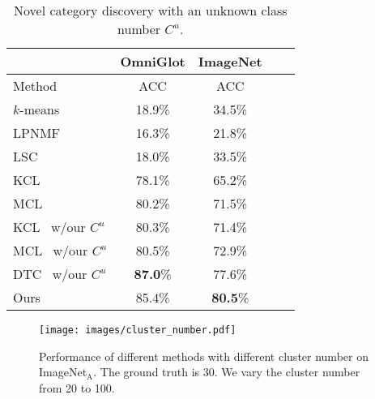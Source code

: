 \begin{table}[ht]
\footnotesize
\centering
\caption{Novel category discovery with an unknown class number $C^u$.}\label{tab:comparison_unknown}
\begin{tabular}{lcccc}
 \toprule
    & OmniGlot
    & ImageNet \\
\midrule
Method & ACC  & ACC  \\
\midrule
$k$-means~\cite{MackQueen67_Kmeans} & 18.9\% & 34.5\%\\
LPNMF~\cite{Cai09_LPNMF}  & 16.3\%  & 21.8\%\\
LSC~\cite{Chen11_LSC}  & 18.0\% & 33.5\% \\
\midrule
KCL~\cite{Hsu18_L2C} & 78.1\% & 65.2\% \\
MCL~\cite{Hsu19_MCL} & 80.2\% & 71.5\% \\
\midrule
KCL~\cite{Hsu18_L2C} w/our $C^u$               & 80.3\%          & 71.4\%  \\
MCL~\cite{Hsu19_MCL} w/our $C^u$               & 80.5\%          & 72.9\%  \\
DTC~\cite{han2019learning} w/our $C^u$        & \textbf{87.0}\%          & 77.6\% \\
\midrule
Ours           & 85.4\% & \textbf{80.5}\% \\
\bottomrule
\end{tabular}
\end{table}

\begin{figure}
  \centering
  \texttt{[image: images/cluster\_number.pdf]}
  \caption{Performance of different methods with different cluster number on ImageNet$_\text{A}$. The ground truth is 30. We vary the cluster number from 20 to 100.}
  \label{fig:cluster_number}
\end{figure}


